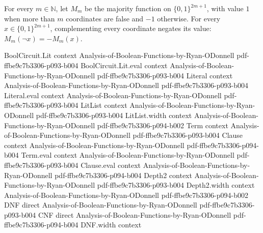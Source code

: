 \begin{lemma}
\leanok
{}
For every $m\in\mathbb N$, let $M_m$ be the majority function on $\{0,1\}^{2m+1}$, with
value $1$ when more than $m$ coordinates are false and $-1$ otherwise. For every
$x\in\{0,1\}^{2m+1}$, complementing every coordinate negates its value: $M_m(\lnot
x)=-M_m(x)$.
\end{lemma}

\begin{lemma}
\leanok
{}
\proofstep
  {BoolCircuit.Lit}
  {context}
  {Analysis-of-Boolean-Functions-by-Ryan-ODonnell}
  {pdf-ffbe9c7b3306-p093-b004}
\proofstep
  {BoolCircuit.Lit.eval}
  {context}
  {Analysis-of-Boolean-Functions-by-Ryan-ODonnell}
  {pdf-ffbe9c7b3306-p093-b004}
\proofstep
  {Literal}
  {context}
  {Analysis-of-Boolean-Functions-by-Ryan-ODonnell}
  {pdf-ffbe9c7b3306-p093-b004}
\proofstep
  {Literal.eval}
  {context}
  {Analysis-of-Boolean-Functions-by-Ryan-ODonnell}
  {pdf-ffbe9c7b3306-p093-b004}
\proofstep
  {LitList}
  {context}
  {Analysis-of-Boolean-Functions-by-Ryan-ODonnell}
  {pdf-ffbe9c7b3306-p093-b004}
\proofstep
  {LitList.width}
  {context}
  {Analysis-of-Boolean-Functions-by-Ryan-ODonnell}
  {pdf-ffbe9c7b3306-p094-b002}
\proofstep
  {Term}
  {context}
  {Analysis-of-Boolean-Functions-by-Ryan-ODonnell}
  {pdf-ffbe9c7b3306-p093-b004}
\proofstep
  {Clause}
  {context}
  {Analysis-of-Boolean-Functions-by-Ryan-ODonnell}
  {pdf-ffbe9c7b3306-p094-b004}
\proofstep
  {Term.eval}
  {context}
  {Analysis-of-Boolean-Functions-by-Ryan-ODonnell}
  {pdf-ffbe9c7b3306-p093-b004}
\proofstep
  {Clause.eval}
  {context}
  {Analysis-of-Boolean-Functions-by-Ryan-ODonnell}
  {pdf-ffbe9c7b3306-p094-b004}
\proofstep
  {Depth2}
  {context}
  {Analysis-of-Boolean-Functions-by-Ryan-ODonnell}
  {pdf-ffbe9c7b3306-p093-b004}
\proofstep
  {Depth2.width}
  {context}
  {Analysis-of-Boolean-Functions-by-Ryan-ODonnell}
  {pdf-ffbe9c7b3306-p094-b002}
\proofstep
  {DNF}
  {direct}
  {Analysis-of-Boolean-Functions-by-Ryan-ODonnell}
  {pdf-ffbe9c7b3306-p093-b004}
\proofstep
  {CNF}
  {direct}
  {Analysis-of-Boolean-Functions-by-Ryan-ODonnell}
  {pdf-ffbe9c7b3306-p094-b004}
\proofstep
  {DNF.width}
  {context}

\end{lemma}
